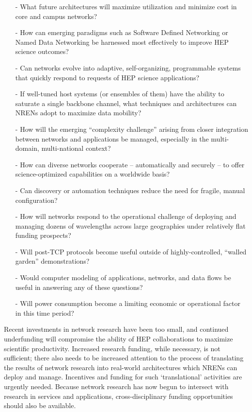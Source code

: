 \begin{itemize}
\item[-] What future architectures will maximize utilization and minimize cost in core and campus networks?
\item[-] How can emerging paradigms such as Software Defined Networking or Named Data Networking be harnessed most effectively to improve HEP science outcomes?
\item[-] Can networks evolve into adaptive, self-organizing, programmable systems that quickly respond to requests of HEP science applications? 
\item[-] If well-tuned host systems (or ensembles of them) have the ability to saturate a single backbone channel, what techniques and architectures can NRENs adopt to maximize data mobility?
\item[-] How will the emerging “complexity challenge” arising from closer integration between networks and applications be managed, especially in the multi-domain, multi-national context?
\item[-] How can diverse networks cooperate – automatically and securely – to offer science-optimized capabilities on a worldwide basis? 
\item[-] Can discovery or automation techniques reduce the need for fragile, manual configuration? 
\item[-] How will networks respond to the operational challenge of deploying  and managing dozens of wavelengths across large geographies under relatively flat funding prospects? 
\item[-] Will post-TCP protocols become useful outside of highly-controlled, “walled garden” demonstrations? 
\item[-] Would computer modeling of applications, networks, and data flows be useful in answering any of these questions?  
\item[-] Will power consumption become a limiting economic or operational factor in this time period? 
\end{itemize}

Recent investments in network research have been too small, and continued underfunding will compromise the ability of HEP collaborations to maximize scientific productivity. Increased research funding, while necessary, is not sufficient; there also needs to be increased attention to the process of translating the results of network research into real-world architectures which NRENs can deploy and manage. Incentives and funding for such ‘translational’ activities are urgently needed. Because network research has now begun to intersect with research in services and applications, cross-disciplinary funding opportunities should also be available.  

